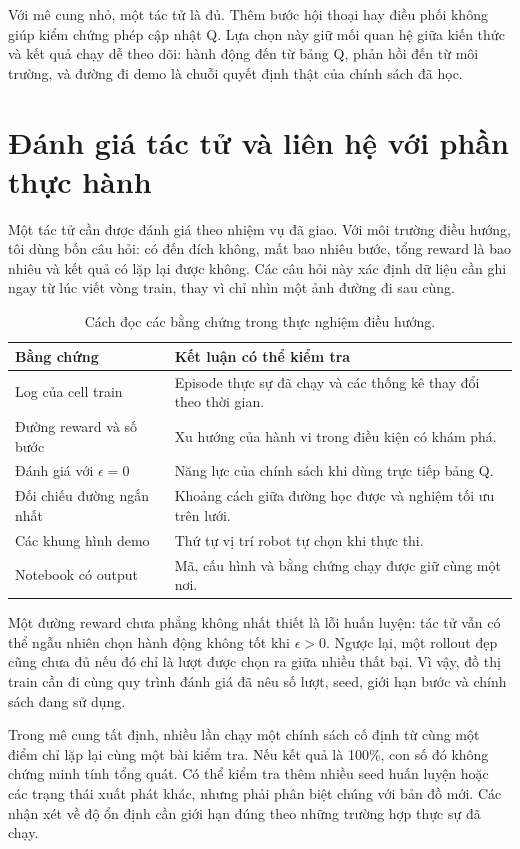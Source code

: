 Với mê cung nhỏ, một tác tử là đủ. Thêm bước hội thoại hay điều phối không giúp kiểm chứng phép cập nhật Q. Lựa chọn này giữ mối quan hệ giữa kiến thức và kết quả chạy dễ theo dõi: hành động đến từ bảng Q, phản hồi đến từ môi trường, và đường đi demo là chuỗi quyết định thật của chính sách đã học.

\clearpage
\section{Đánh giá tác tử và liên hệ với phần thực hành}
Một tác tử cần được đánh giá theo nhiệm vụ đã giao. Với môi trường điều hướng, tôi dùng bốn câu hỏi: có đến đích không, mất bao nhiêu bước, tổng reward là bao nhiêu và kết quả có lặp lại được không. Các câu hỏi này xác định dữ liệu cần ghi ngay từ lúc viết vòng train, thay vì chỉ nhìn một ảnh đường đi sau cùng.

\begin{table}[H]\centering\small
\caption{Cách đọc các bằng chứng trong thực nghiệm điều hướng.}
\begin{tabularx}{\textwidth}{@{}p{3cm}Y@{}}\toprule
Bằng chứng & Kết luận có thể kiểm tra \\\midrule
Log của cell train & Episode thực sự đã chạy và các thống kê thay đổi theo thời gian. \\
Đường reward và số bước & Xu hướng của hành vi trong điều kiện có khám phá. \\
Đánh giá với $\epsilon=0$ & Năng lực của chính sách khi dùng trực tiếp bảng Q. \\
Đối chiếu đường ngắn nhất & Khoảng cách giữa đường học được và nghiệm tối ưu trên lưới. \\
Các khung hình demo & Thứ tự vị trí robot tự chọn khi thực thi. \\
Notebook có output & Mã, cấu hình và bằng chứng chạy được giữ cùng một nơi. \\\bottomrule
\end{tabularx}
\end{table}

Một đường reward chưa phẳng không nhất thiết là lỗi huấn luyện: tác tử vẫn có thể ngẫu nhiên chọn hành động không tốt khi $\epsilon>0$. Ngược lại, một rollout đẹp cũng chưa đủ nếu đó chỉ là lượt được chọn ra giữa nhiều thất bại. Vì vậy, đồ thị train cần đi cùng quy trình đánh giá đã nêu số lượt, seed, giới hạn bước và chính sách đang sử dụng.

Trong mê cung tất định, nhiều lần chạy một chính sách cố định từ cùng một điểm chỉ lặp lại cùng một bài kiểm tra. Nếu kết quả là 100\%, con số đó không chứng minh tính tổng quát. Có thể kiểm tra thêm nhiều seed huấn luyện hoặc các trạng thái xuất phát khác, nhưng phải phân biệt chúng với bản đồ mới. Các nhận xét về độ ổn định cần giới hạn đúng theo những trường hợp thực sự đã chạy.

